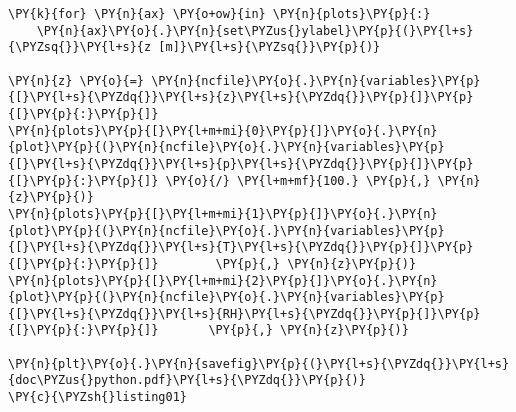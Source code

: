 \begin{Verbatim}[commandchars=\\\{\}]
\PY{k}{for} \PY{n}{ax} \PY{o+ow}{in} \PY{n}{plots}\PY{p}{:}
    \PY{n}{ax}\PY{o}{.}\PY{n}{set\PYZus{}ylabel}\PY{p}{(}\PY{l+s}{\PYZsq{}}\PY{l+s}{z [m]}\PY{l+s}{\PYZsq{}}\PY{p}{)}

\PY{n}{z} \PY{o}{=} \PY{n}{ncfile}\PY{o}{.}\PY{n}{variables}\PY{p}{[}\PY{l+s}{\PYZdq{}}\PY{l+s}{z}\PY{l+s}{\PYZdq{}}\PY{p}{]}\PY{p}{[}\PY{p}{:}\PY{p}{]}
\PY{n}{plots}\PY{p}{[}\PY{l+m+mi}{0}\PY{p}{]}\PY{o}{.}\PY{n}{plot}\PY{p}{(}\PY{n}{ncfile}\PY{o}{.}\PY{n}{variables}\PY{p}{[}\PY{l+s}{\PYZdq{}}\PY{l+s}{p}\PY{l+s}{\PYZdq{}}\PY{p}{]}\PY{p}{[}\PY{p}{:}\PY{p}{]} \PY{o}{/} \PY{l+m+mf}{100.} \PY{p}{,} \PY{n}{z}\PY{p}{)}
\PY{n}{plots}\PY{p}{[}\PY{l+m+mi}{1}\PY{p}{]}\PY{o}{.}\PY{n}{plot}\PY{p}{(}\PY{n}{ncfile}\PY{o}{.}\PY{n}{variables}\PY{p}{[}\PY{l+s}{\PYZdq{}}\PY{l+s}{T}\PY{l+s}{\PYZdq{}}\PY{p}{]}\PY{p}{[}\PY{p}{:}\PY{p}{]}        \PY{p}{,} \PY{n}{z}\PY{p}{)}
\PY{n}{plots}\PY{p}{[}\PY{l+m+mi}{2}\PY{p}{]}\PY{o}{.}\PY{n}{plot}\PY{p}{(}\PY{n}{ncfile}\PY{o}{.}\PY{n}{variables}\PY{p}{[}\PY{l+s}{\PYZdq{}}\PY{l+s}{RH}\PY{l+s}{\PYZdq{}}\PY{p}{]}\PY{p}{[}\PY{p}{:}\PY{p}{]}       \PY{p}{,} \PY{n}{z}\PY{p}{)} 
   
\PY{n}{plt}\PY{o}{.}\PY{n}{savefig}\PY{p}{(}\PY{l+s}{\PYZdq{}}\PY{l+s}{doc\PYZus{}python.pdf}\PY{l+s}{\PYZdq{}}\PY{p}{)}
\PY{c}{\PYZsh{}listing01}
\end{Verbatim}
